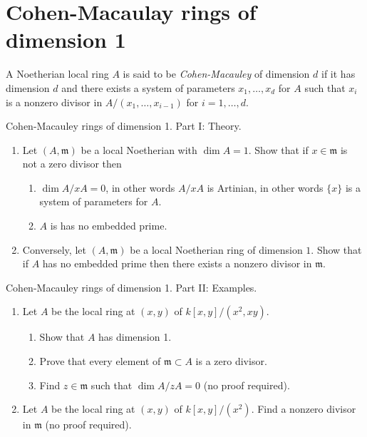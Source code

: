 \section{Cohen-Macaulay rings of dimension 1}
\label{section-CM-dim-1}

\begin{definition}
A Noetherian local ring $A$ is said to be {\it Cohen-Macauley}
of dimension $d$ if it has dimension $d$ and there exists a system
of parameters $x_1,\ldots,x_d$ for $A$ such that $x_i$ is a nonzero
divisor in $A/(x_1,\ldots,x_{i-1})$ for $i=1,\ldots,d$.
\end{definition}

\begin{exercise}
Cohen-Macauley rings of dimension 1. Part I: Theory.
\begin{enumerate}
\item Let $(A, {\mathfrak m})$ be a local Noetherian with $\dim A=1$.
Show that if $x\in {\mathfrak m}$ is not a zero divisor then
\begin{enumerate}
\item $\dim A/xA=0$, in other words $A/xA$ is Artinian,
in other words $\{x\}$ is a system of parameters for $A$.
\item $A$ is has no embedded prime.
\end{enumerate}
\item Conversely, let $(A,{\mathfrak m})$ be a local Noetherian ring of
dimension $1$. Show that if $A$ has no embedded prime then there exists
a nonzero divisor in ${\mathfrak m}$.
\end{enumerate}
\end{exercise}

\begin{exercise}
Cohen-Macauley rings of dimension 1. Part II: Examples.
\begin{enumerate}
\item Let $A$ be the local ring at $(x,y)$ of $k[x,y]/(x^2,xy)$.
\begin{enumerate}
\item Show that $A$ has dimension 1.
\item Prove that every element of ${\mathfrak m}\subset A$ is a
zero divisor.
\item Find $z\in {\mathfrak m}$ such that $\dim A/zA=0$
(no proof required).
\end{enumerate}
\item Let $A$ be the local ring at $(x,y)$ of $k[x,y]/(x^2)$.
Find a nonzero divisor in ${\mathfrak m}$ (no proof required).
\end{enumerate}
\end{exercise}

